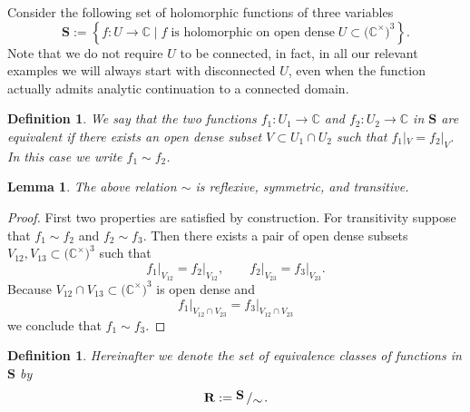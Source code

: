 \documentclass{amsart}
\newtheorem{definition}[theorem]{Definition}
\newtheorem{lemma}[theorem]{Lemma}
\newcommand{\bigslant}[2]{{\raisebox{.2em}{$#1$}\left/\raisebox{-.2em}{$#2$}\right.}}
\begin{document}
Consider the following set of holomorphic functions of three variables
\begin{equation}
\mathbf S:=\left\{f:U\rightarrow\mathbb C\;\Big|\; f\;\textrm{is holomorphic on open dense}\;U\subset\big(\mathbb C^\times\big)^3\right\}.
\label{eq:HolomorphicFunctionsOnOpenDenseSubsets}
\end{equation}
Note that we do not require $U$ to be connected, in fact, in all our relevant examples we will always start with disconnected $U$, even when the function actually admits analytic continuation to a connected domain.
\begin{definition}
We say that the two functions $f_1:U_1\rightarrow\mathbb C$ and $f_2:U_2\rightarrow\mathbb C$ in $\mathbf S$ are \textit{equivalent} if there exists an open dense subset $V\subset U_1\cap U_2$ such that  $f_1|_V=f_2|_V$. In this case we write $f_1\sim f_2$.
\label{def:SimEquivalenceRelation}
\end{definition}
\begin{lemma}
The above relation $\sim$ is reflexive, symmetric, and transitive.
\end{lemma}
\begin{proof}
First two properties are satisfied by construction. For transitivity suppose that $f_1\sim f_2$ and $f_2\sim f_3$. Then there exists a pair of open dense subsets $V_{12},V_{13}\subset\big(\mathbb C^\times\big)^3$ such that
\begin{equation*}
    f_1\big|_{V_{12}}=f_2\big|_{V_{12}},\qquad f_2\big|_{V_{23}}=f_3\big|_{V_{23}}.
\end{equation*}
Because $V_{12}\cap V_{13}\subset\big(\mathbb C^\times\big)^3$ is open dense and
\begin{equation*}
f_1\big|_{V_{12}\cap V_{23}}=f_3\big|_{V_{12}\cap V_{23}}
\end{equation*}
we conclude that $f_1\sim f_3$.
\end{proof}
\begin{definition}
Hereinafter we denote the set of equivalence classes of functions in $\mathbf S$ by
\begin{equation*}
\mathbf R:=\bigslant{\mathbf S}{\sim}.
\end{equation*}
\end{definition}
\end{document}
